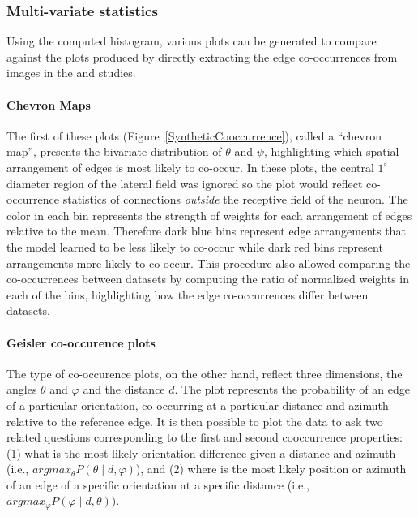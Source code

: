 \subsubsection*{Multi-variate statistics}

Using the computed histogram, various plots can be generated to
compare against the plots produced by directly extracting the edge
co-occurrences from images in the \cite{Perrinet2015} and
\cite{Geisler2001} studies.

\paragraph{Chevron Maps}

The first of these plots (Figure~\ref{SyntheticCooccurrence}), called
a ``chevron map'', presents the bivariate distribution of $\theta$ and
$\psi$, highlighting which spatial arrangement of edges is most likely
to co-occur. In these plots, the central $1^\circ$ diameter region of
the lateral field was ignored so the plot would reflect co-occurrence
statistics of connections \emph{outside} the receptive field of the
neuron. The color in each bin represents the strength of weights for
each arrangement of edges relative to the mean. Therefore dark blue
bins represent edge arrangements that the model learned to be less
likely to co-occur while dark red bins represent arrangements more
likely to co-occur. This procedure also allowed comparing the
co-occurrences between datasets by computing the ratio of normalized
weights in each of the bins, highlighting how the edge co-occurrences
differ between datasets.

\paragraph{Geisler co-occurence plots}

The \cite{Geisler2001} type of co-occurence plots, on the other hand,
reflect three dimensions, the angles $\theta$ and $\varphi$ and the
distance $d$. The plot represents the probability of an edge of a
particular orientation, co-occurring at a particular distance and
azimuth relative to the reference edge. It is then possible to plot
the data to ask two related questions corresponding to the first and
second cooccurrence properties: (1) what is the most likely
orientation difference given a distance and azimuth (i.e.,
$argmax_\theta P(\theta \mid d, \varphi)$), and (2) where is the most
likely position or azimuth of an edge of a specific orientation at a
specific distance (i.e., $argmax_\varphi P(\varphi \mid d,
\theta)$).


